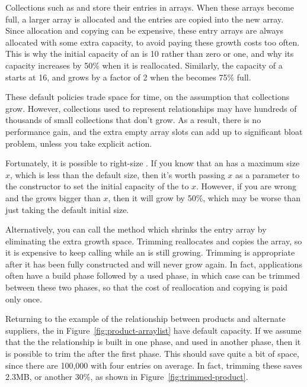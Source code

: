 Collections such as  and  store their entries in
arrays. When these arrays become full, a larger array is allocated
and the entries are copied into the new array.  Since allocation and copying
can be expensive, these entry arrays are always allocated with some extra
capacity, to avoid paying these growth costs too often. 
This is why the initial capacity of an  is 10 rather than zero
 or one, and why its capacity increases by
50\% when it is reallocated. 
Similarly, the capacity of a  starts at 16, and grows by a
factor of 2 when the  becomes 75\% full. 

These default policies trade space
for time, on the assumption that collections grow. However,
collections used to represent relationships may have hundreds of thousands of
small collections that don't grow. As a result, there is no performance gain, and the extra
empty array slots can add up to significant bloat problem, unless you take
explicit action.

 Fortunately, it is possible to right-size
 . If you know that an  has a maximum size
 $x$, which is less than the default size, then it's worth passing $x$ as a
 parameter to the constructor to set the initial capacity of the
  to $x$. However, if you are wrong and the 
 grows bigger than $x$, then it will grow by 50\%, which may
 be worse than just taking the default initial size.
 
 Alternatively, you can call the  method which shrinks the
 entry array by eliminating the extra growth space. Trimming reallocates and
 copies the array, so it is expensive to keep calling  while an
  is still growing. Trimming is appropriate after
 it has been fully constructed and will never grow again. In fact, applications
 often have a build phase followed by a used phase, in which case
  can be trimmed between these two phases, so that the cost of reallocation 
 and copying is paid only once.
 
 Returning to the example of the relationship between products and alternate
 suppliers, the  in Figure~\ref{fig:product-arraylist} have
  default capacity. If we assume that the the relationship is built in one
  phase, and used in another phase, then it is possible to trim the
   after the first phase. This should save quite a bit of
  space, since there are 100,000  with four entries on
  average. In fact, trimming these
  saves 2.3MB, or another 30\%, as shown in
 Figure~\ref{fig:trimmed-product}. 

